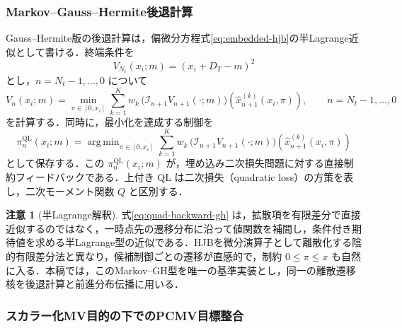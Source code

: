 \documentclass[10pt,a4paper]{article}
\theoremstyle{plain}
\theoremstyle{definition}
\newtheorem{remark}{注意}
\DeclareMathOperator*{\argmin}{arg\,min}
\begin{document}
\subsubsection{Markov--Gauss--Hermite後退計算}

Gauss--Hermite版の後退計算は，偏微分方程式\eqref{eq:embedded-hjb}の半Lagrange近似として書ける．終端条件を
\begin{equation}
  V_{N_t}(x_i;m)=(x_i+D_T-m)^2
  \label{eq:terminal-discrete-quad}
\end{equation}
とし，$n=N_t-1,\ldots,0$ について
\begin{equation}
  V_n(x_i;m)=
  \min_{\pi\in[0,x_i]}
  \sum_{k=1}^K w_k\,
  \bigl(\mathcal I_{n+1}V_{n+1}(\cdot;m)\bigr)
  \left(\widehat{x}_{n+1}^{(k)}(x_i,\pi)\right),
  \qquad n=N_t-1,\ldots,0
  \label{eq:quad-backward-gh}
\end{equation}
を計算する．同時に，最小化を達成する制御を
\begin{equation}
  \pi_n^{\mathrm{QL}}(x_i;m)=
  \argmin_{\pi\in[0,x_i]}
  \sum_{k=1}^K w_k\,
  \bigl(\mathcal I_{n+1}V_{n+1}(\cdot;m)\bigr)
  \left(\widehat{x}_{n+1}^{(k)}(x_i,\pi)\right)
  \label{eq:quad-feedback-gh}
\end{equation}
として保存する．この $\pi_n^{\mathrm{QL}}(x_i;m)$ が，埋め込み二次損失問題に対する直接制約フィードバックである．上付き $\mathrm{QL}$ は二次損失（quadratic loss）の方策を表し，二次モーメント関数 $Q$ と区別する．

\begin{remark}[半Lagrange解釈]
式\eqref{eq:quad-backward-gh} は，拡散項を有限差分で直接近似するのではなく，一時点先の遷移分布に沿って値関数を補間し，条件付き期待値を求める半Lagrange型の近似である．HJBを微分演算子として離散化する陰的有限差分法と異なり，候補制御ごとの遷移が直感的で，制約 $0\leq\pi\leq x$ も自然に入る．本稿では，このMarkov--GH型を唯一の基準実装とし，同一の離散遷移核を後退計算と前進分布伝播に用いる．
\end{remark}

\subsubsection{スカラー化MV目的の下でのPCMV目標整合}
\end{document}
